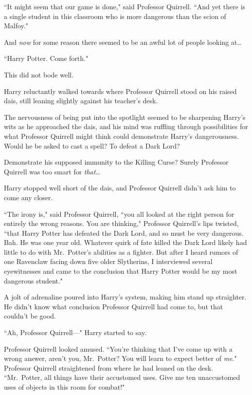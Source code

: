 ``It might seem that our game is done," said Professor Quirrell. ``And yet there is a single student in this classroom who is more dangerous than the scion of Malfoy."

And \emph{now} for some reason there seemed to be an awful lot of people looking at{\ldots}

``Harry Potter. Come forth."

This did not bode well.

Harry reluctantly walked towards where Professor Quirrell stood on his raised dais, still leaning slightly against his teacher's desk.

The nervousness of being put into the spotlight seemed to be sharpening Harry's wits as he approached the dais, and his mind was ruffling through possibilities for what Professor Quirrell might think could demonstrate Harry's dangerousness. Would he be asked to cast a spell? To defeat a Dark Lord?

Demonstrate his supposed immunity to the Killing Curse? Surely Professor Quirrell was too smart for \emph{that}{\ldots}

Harry stopped well short of the dais, and Professor Quirrell didn't ask him to come any closer.

``The irony is," said Professor Quirrell, ``you all looked at the right person for entirely the wrong reasons. You are thinking," Professor Quirrell's lips twisted, ``that Harry Potter has defeated the Dark Lord, and so must be very dangerous. Bah. He was one year old. Whatever quirk of fate killed the Dark Lord likely had little to do with Mr.~Potter's abilities as a fighter. But after I heard rumors of one Ravenclaw facing down five older Slytherins, I interviewed several eyewitnesses and came to the conclusion that Harry Potter would be my most dangerous student."

A jolt of adrenaline poured into Harry's system, making him stand up straighter. He didn't know what conclusion Professor Quirrell had come to, but that couldn't be good.

``Ah, Professor Quirrell—" Harry started to say.

Professor Quirrell looked amused. ``You're thinking that I've come up with a wrong answer, aren't you, Mr.~Potter? You will learn to expect better of \emph{me}." Professor Quirrell straightened from where he had leaned on the desk. ``Mr.~Potter, all things have their accustomed uses. Give me ten unaccustomed uses of objects in this room for combat!"

